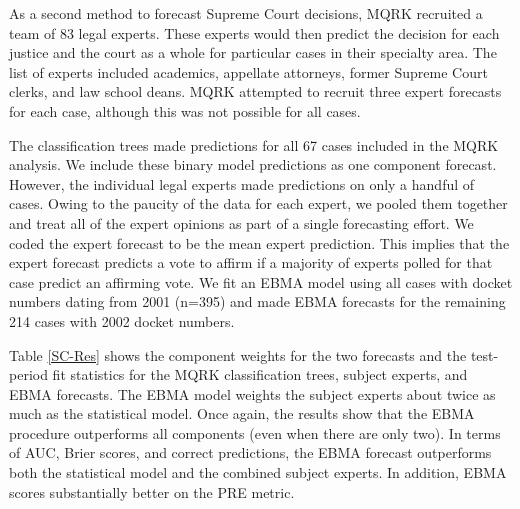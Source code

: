 As a second method to forecast Supreme Court decisions, MQRK recruited
a team of 83 legal experts. These experts would then predict the
decision for each justice and the court as a whole for particular
cases in their specialty area. The list of experts included academics,
appellate attorneys, former Supreme Court clerks, and law school
deans. MQRK attempted to recruit three expert forecasts for each case,
although this was not possible for all cases.

The classification trees made predictions for all 67 cases included in
the MQRK analysis. We include these binary model predictions as one
component forecast. However, the individual legal experts made
predictions on only a handful of cases. Owing to the paucity of the
data for each expert, we pooled them together and treat all of the
expert opinions as part of a single forecasting effort. We coded the
expert forecast to be the mean expert prediction. This implies that
the expert forecast predicts a vote to affirm if a majority of experts
polled for that case predict an affirming vote. We fit an EBMA model
using all cases with docket numbers dating from 2001 (n=395) and made
EBMA forecasts for the remaining 214 cases with 2002 docket
numbers.

Table \ref{SC-Res} shows the component weights for the two forecasts
and the test-period fit statistics for the MQRK classification trees,
subject experts, and EBMA forecasts. The EBMA model weights the
subject experts about twice as much as the statistical model. Once
again, the results show that the EBMA procedure outperforms all
components (even when there are only two). In terms of AUC, Brier
scores, and correct predictions, the EBMA forecast outperforms both
the statistical model and the combined subject experts. In addition,
EBMA scores substantially better on the PRE metric.
  
